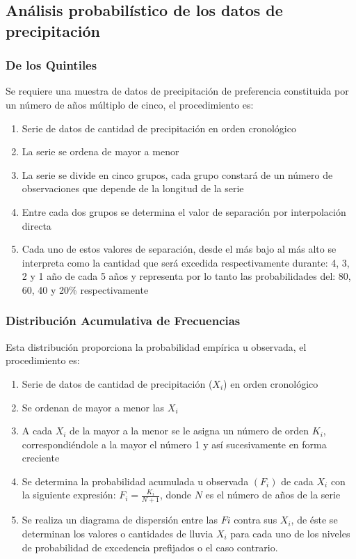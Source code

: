 \subsection{Análisis probabilístico de los datos de precipitación}

\subsubsection{De los Quintiles}
Se requiere una muestra de datos de precipitación de preferencia constituida por un número de años múltiplo de cinco, el procedimiento es:
\begin{enumerate}
    \item Serie de datos de cantidad de precipitación en orden cronológico
    \item La serie se ordena de mayor a menor
    \item La serie se divide en cinco grupos, cada grupo constará de un número de observaciones que depende de la longitud de la serie
    \item Entre cada dos grupos se determina el valor de separación por interpolación directa
    \item Cada uno de estos valores de separación, desde el más bajo al más alto se interpreta como la cantidad que será excedida respectivamente durante: 4, 3, 2 y 1 año de cada 5 años y representa por lo tanto las probabilidades del: 80, 60, 40 y 20\% respectivamente
\end{enumerate}
\subsubsection{Distribución Acumulativa de
Frecuencias}
Esta distribución proporciona la probabilidad empírica u observada, el procedimiento es:
\begin{enumerate}
    \item Serie de datos de cantidad de precipitación ($X_i$) en orden cronológico
    \item Se ordenan de mayor a menor las $X_i$
    \item A cada $X_i$ de la mayor a la menor se le asigna un número de orden $K_i$, correspondiéndole a la mayor el número 1 y así sucesivamente en forma creciente
    \item Se determina la probabilidad acumulada u observada $(F_i)$ de cada $X_i$ con la siguiente expresión: $F_i = \frac{K_i}{N+1}$, donde $N$ es el número de años de la serie
    \item Se realiza un diagrama de dispersión entre las $Fi$ contra sus $X_i$, de éste se determinan los valores o cantidades de lluvia $X_i$ para cada uno de los niveles de probabilidad de excedencia prefijados o el
    caso contrario.
\end{enumerate}

